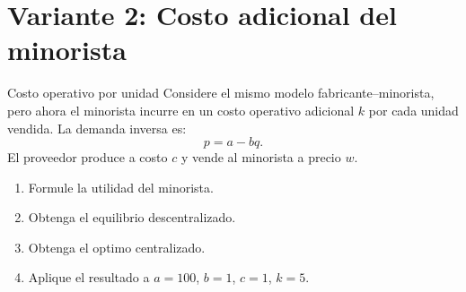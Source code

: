 \section{Variante 2: Costo adicional del minorista}

\begin{enunciado}{Costo operativo por unidad}
Considere el mismo modelo fabricante--minorista, pero ahora el minorista incurre en un costo operativo adicional \(k\) por cada unidad vendida. La demanda inversa es:
\[
p=a-bq.
\]
El proveedor produce a costo \(c\) y vende al minorista a precio \(w\).

\begin{enumerate}[label=(\alph*)]
    \item Formule la utilidad del minorista.
    \item Obtenga el equilibrio descentralizado.
    \item Obtenga el optimo centralizado.
    \item Aplique el resultado a \(a=100\), \(b=1\), \(c=1\), \(k=5\).
\end{enumerate}
\end{enunciado}
